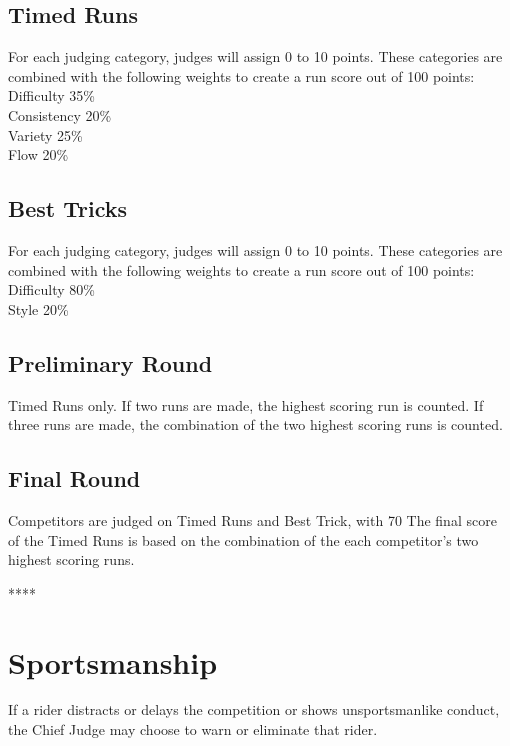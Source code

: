 \subsection{Timed Runs}
For each judging category, judges will assign 0 to 10 points. These categories are combined with the following weights to create a run score out of 100 points:\\
Difficulty 35\% \\
Consistency 20\% \\
Variety 25\% \\
Flow 20\% \\

\subsection{Best Tricks}
For each judging category, judges will assign 0 to 10 points. These categories are combined with the following weights to create a run score out of 100 points:\\
Difficulty 80\% \\
Style 20\% \\

\subsection{Preliminary Round}
Timed Runs only.
If two runs are made, the highest scoring run is counted.
If three runs are made, the combination of the two highest scoring runs is counted.

\subsection{Final Round}
Competitors are judged on Timed Runs and Best Trick, with 70%
The final score of the Timed Runs is based on the combination of the each competitor's two highest scoring runs.

****
\section{Sportsmanship}
If a rider distracts or delays the competition or shows unsportsmanlike conduct, the Chief Judge may choose to warn or eliminate that rider.
